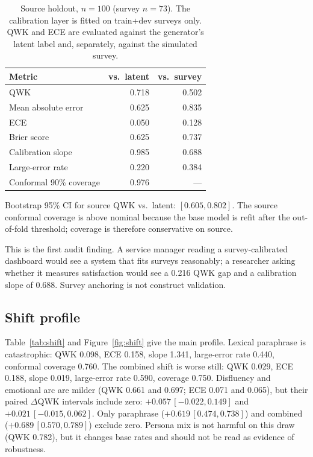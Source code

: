 \documentclass[11pt,a4paper]{article}
\begin{document}
\begin{table}[t]
\centering
\caption{Source holdout, $n=100$ (survey $n=73$). The calibration layer is fitted on train+dev
surveys only. QWK and ECE are evaluated against the generator's latent label and, separately,
against the simulated survey.}
\label{tab:baseline}
\begin{threeparttable}
\begin{tabular}{@{}lrr@{}}
\toprule
Metric & vs.\ latent & vs.\ survey \\
\midrule
QWK & 0.718 & 0.502 \\
Mean absolute error & 0.625 & 0.835 \\
ECE & 0.050 & 0.128 \\
Brier score & 0.625 & 0.737 \\
Calibration slope & 0.985 & 0.688 \\
Large-error rate & 0.220 & 0.384 \\
Conformal 90\% coverage & 0.976 & --- \\
\bottomrule
\end{tabular}
\begin{tablenotes}\footnotesize\raggedright
\item Bootstrap 95\% CI for source QWK vs.\ latent: $[0.605,0.802]$. The source conformal
coverage is above nominal because the base model is refit after the out-of-fold threshold;
coverage is therefore conservative on source.
\end{tablenotes}
\end{threeparttable}
\end{table}

This is the first audit finding. A service manager reading a survey-calibrated dashboard would
see a system that fits surveys reasonably; a researcher asking whether it measures satisfaction
would see a 0.216 QWK gap and a calibration slope of 0.688. Survey anchoring is not construct
validation.

\subsection{Shift profile}

Table~\ref{tab:shift} and Figure~\ref{fig:shift} give the main profile. Lexical paraphrase is
catastrophic: QWK 0.098, ECE 0.158, slope 1.341, large-error rate 0.440, conformal coverage
0.760. The combined shift is worse still: QWK 0.029, ECE 0.188, slope 0.019, large-error rate
0.590, coverage 0.750. Disfluency and emotional arc are milder (QWK 0.661 and 0.697; ECE 0.071
and 0.065), but their paired $\Delta$QWK intervals include zero:
$+0.057\,[-0.022,0.149]$ and $+0.021\,[-0.015,0.062]$. Only paraphrase
($+0.619\,[0.474,0.738]$) and combined ($+0.689\,[0.570,0.789]$) exclude zero. Persona mix is
not harmful on this draw (QWK 0.782), but it changes base rates and should not be read as
evidence of robustness.
\end{document}
